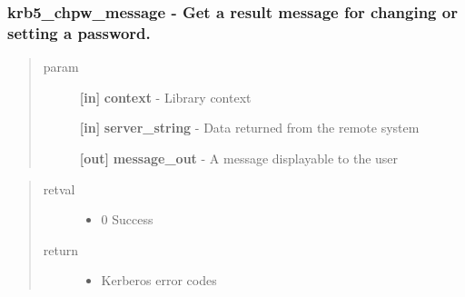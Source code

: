 \documentclass[letterpaper,10pt,english]{sphinxmanual}
\begin{document}
\subsubsection{krb5\_chpw\_message -  Get a result message for changing or setting a password.}
\label{appdev/refs/api/krb5_chpw_message:krb5-chpw-message-get-a-result-message-for-changing-or-setting-a-password}\label{appdev/refs/api/krb5_chpw_message::doc}

\begin{fulllineitems}
\label{appdev/refs/api/krb5_chpw_message:krb5_chpw_message}
\end{fulllineitems}

\begin{quote}\begin{description}
\item[{param}] \leavevmode
\textbf{{[}in{]}} \textbf{context} - Library context

\textbf{{[}in{]}} \textbf{server\_string} - Data returned from the remote system

\textbf{{[}out{]}} \textbf{message\_out} - A message displayable to the user

\end{description}\end{quote}
\begin{quote}\begin{description}
\item[{retval}] \leavevmode\begin{itemize}
\item {} 
0   Success

\end{itemize}

\item[{return}] \leavevmode\begin{itemize}
\item {} 
Kerberos error codes

\end{itemize}

\end{description}\end{quote}
\end{document}
